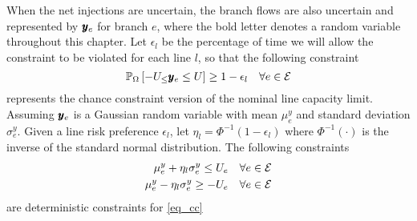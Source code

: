 When the net injections are uncertain, the branch flows are also uncertain and represented by $\pmb{y}_e$ for branch $e$, where the bold letter denotes a random variable throughout this chapter.  Let $\epsilon_l$ be the percentage of time we will allow the constraint to be violated for each line $l$, so that the following constraint 
\begin{equation}\label{eq_cc}
 \bP{\Omega}{  -U_ \leq  \ry_e \leq U } \geq 1- \epsilon_l \hspace{10px} \forall e \in \cE
\end{equation}
represents the chance constraint version of the nominal line capacity limit.  Assuming $\pmb{y}_e$ is a Gaussian random variable with mean $\mu^y_e$ and standard deviation $\sigma^y_e$. Given a line risk preference $\epsilon_l$, let $\eta_l = \Phi^{-1}\left(1-\epsilon_l\right)$ where $\Phi^{-1} ( \cdot )$ is the inverse of the standard normal distribution. The following constraints
\begin{align*}
 \mu^y_e + \eta_l \sigma^y_e \leq U_e  \hspace{10px} \forall e \in \cE \\
 \mu^y_e - \eta_l \sigma^y_e \geq -U_e  \hspace{10px} \forall e \in \cE
\end{align*}
are deterministic constraints for \ref{eq_cc}

